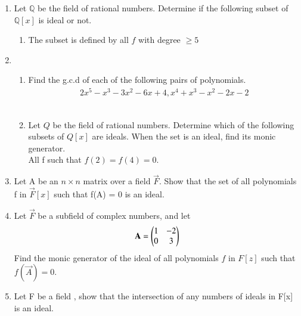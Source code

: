\renewcommand{\theequation}{\theenumi}
\renewcommand{\thefigure}{\theenumi}
\begin{enumerate}[label=\thesubsection.\arabic*.,ref=\thesubsection.\theenumi]

\item Let $\mathbb{Q}$ be the field of rational numbers. Determine if the following subset of $\mathbb{Q}[x]$ is ideal or not. 
\begin{enumerate}
\item The subset is defined by all $f$ with degree $\geq 5$
%
%
\\
\solution

\end{enumerate}
\item 
\begin{enumerate}
\item Find the g.c.d of each of the following pairs of polynomials.
    \begin{align}
    2x^{5}-x^{3}-3x^{2}-6x+4 , x^{4}+x^{3}-x^{2}-2x-2
    \end{align}
%
\\
\solution

\item Let $Q$ be the field of rational numbers. Determine which of the following subsets of $Q[x]$ are ideals. When the set is an ideal, find its monic generator.\\
All f such that $f(2)=f(4)=0$.
%
\\
\solution

\end{enumerate}
\item Let A be an $n \times n$ matrix over a field $\vec{F}$. Show that the set of all polynomials
f in $\vec{F}[x]$ such that f(A) = 0 is an ideal.
%
\\
\solution

\item Let $\vec{F}$ be a subfield of complex numbers, and let
\begin{align}
\mathbf{A}=\begin{pmatrix}1&-2\\0&3\end{pmatrix}
\end{align}
Find the monic generator of the ideal of all polynomials $f$ in $F[z]$ such that $f(\vec{A}) = 0$.
%
\\
\solution

\item Let F be a field , show that the intersection of any numbers of ideals in F[x] is an ideal.
%
\\
\solution

\end{enumerate}
